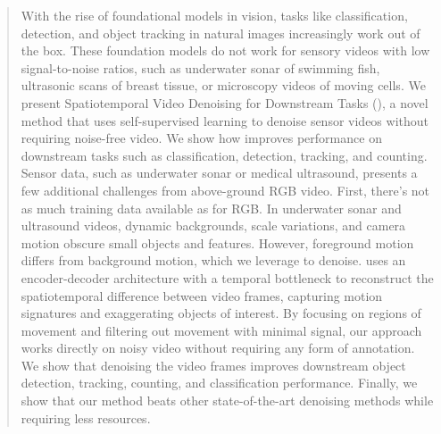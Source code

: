 \begin{abstract}
With the rise of foundational models in vision, tasks like classification, detection, and object tracking in natural images increasingly work out of the box.
These foundation models do not work for sensory videos with low signal-to-noise ratios, such as underwater sonar of swimming fish, ultrasonic scans of breast tissue, or microscopy videos of moving cells.
We present Spatiotemporal Video Denoising for Downstream Tasks (\NAME{}), a novel method that uses self-supervised learning to denoise sensor videos without requiring noise-free video.
We show how \NAME{} improves performance on downstream tasks such as classification, detection, tracking, and counting.
Sensor data, such as underwater sonar or medical ultrasound, presents a few additional challenges from above-ground RGB video. 
First, there's not as much training data available as for RGB. 
In underwater sonar and ultrasound videos, dynamic backgrounds, scale variations, and camera motion obscure small objects and features. However, foreground motion differs from background motion, which we leverage to denoise.
 \NAME{} uses an encoder-decoder architecture with a temporal bottleneck to reconstruct the spatiotemporal difference between video frames, capturing motion signatures and exaggerating objects of interest. 
 By focusing on regions of movement and filtering out movement with minimal signal, our approach works directly on noisy video without requiring any form of annotation. 
We show that denoising the video frames improves downstream object detection, tracking, counting, and classification performance. 
Finally, we show that our method beats other state-of-the-art denoising methods while requiring less resources.

\end{abstract}
\fi




    